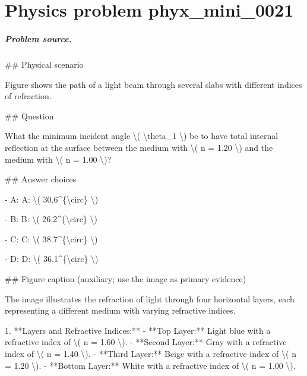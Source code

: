 
\chapter{Physics problem phyx\_mini\_0021}
\label{ch:PhyXMiniProblems_problem_phyx_mini_0021}

\paragraph{Problem source.}
\#\# Physical scenario

Figure shows the path of a light beam through several slabs with different indices of refraction.

\#\# Question

What the minimum incident angle \textbackslash{}( \textbackslash{}theta\_1 \textbackslash{}) be to have total internal reflection at the surface between the medium with \textbackslash{}( n = 1.20 \textbackslash{}) and the medium with \textbackslash{}( n = 1.00 \textbackslash{})?

\#\# Answer choices

- A: A: \textbackslash{}( 30.6\textasciicircum{}\{\textbackslash{}circ\} \textbackslash{})

- B: B: \textbackslash{}( 26.2\textasciicircum{}\{\textbackslash{}circ\} \textbackslash{})

- C: C: \textbackslash{}( 38.7\textasciicircum{}\{\textbackslash{}circ\} \textbackslash{})

- D: D: \textbackslash{}( 36.1\textasciicircum{}\{\textbackslash{}circ\} \textbackslash{})

\#\# Figure caption (auxiliary; use the image as primary evidence)

The image illustrates the refraction of light through four horizontal layers, each representing a different medium with varying refractive indices. 

1. **Layers and Refractive Indices:**
   - **Top Layer:** Light blue with a refractive index of \textbackslash{}( n = 1.60 \textbackslash{}).
   - **Second Layer:** Gray with a refractive index of \textbackslash{}( n = 1.40 \textbackslash{}).
   - **Third Layer:** Beige with a refractive index of \textbackslash{}( n = 1.20 \textbackslash{}).
   - **Bottom Layer:** White with a refractive index of \textbackslash{}( n = 1.00 \textbackslash{}).

